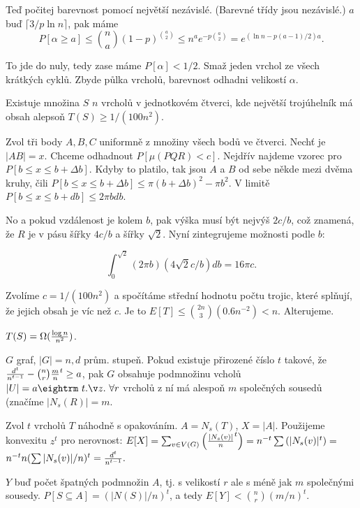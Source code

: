 Teď počitej barevnost pomocí největší nezávislé. (Barevné třídy jsou
nezávislé.) $a$ buď $\lceil 3/p \ln n \rceil$, pak máme
$$P[\alpha \ge a] \le {n \choose a} (1-p)^{{a \choose 2}} \le n^a e^{-p{a \choose 2}} =
e^{(\ln n -p(a-1)/2)a}.$$

To jde do nuly, tedy zase máme $P[\alpha] < 1/2$. Smaž jeden vrchol ze všech
krátkých cyklů.  Zbyde půlka vrcholů, barevnost odhadni velikostí $\alpha$.

\thm{} Existuje množina $S$ $n$ vrcholů v jednotkovém čtverci, kde
největší trojúhelník má obsah alepsoň $T(S) \ge 1/(100n^2)$.

\prf{} Zvol tři body $A,B,C$ uniformně z množiny všech bodů ve
čtverci. Nechť je $|AB| = x$. Chceme odhadnout $P[\mu(PQR) < c]$.
Nejdřív najdeme vzorec pro $P[b \le x \le b + \Delta b]$. Kdyby to
platilo, tak jsou $A$ a $B$ od sebe někde mezi dvěma kruhy, čili $P[b
\le x \le b + \Delta b] \le \pi(b+\Delta b)^2 - \pi b^2$. V limitě
$P[b \le x \le b + db] \le 2\pi b db$.

No a pokud vzdálenost je kolem $b$, pak výška musí být nejvýš $2c/b$,
což znamená, že $R$ je v pásu šířky $4c/b$ a šířky $\sqrt{2}$. Nyní
zintegrujeme možnosti podle $b$:

$$ \int_0^{\sqrt{2}}(2 \pi b)(4 \sqrt{2} c / b) db = 16 \pi c. $$ 

Zvolíme $c = 1/(100n^2)$ a spočítáme střední hodnotu počtu trojic,
které splňují, že jejich obsah je víc než $c$. Je to $E[T] \le {2n
\choose 3}(0.6n^{-2}) < n$. Alterujeme.

 $T(S) = \Omega({\log n \over n^2})$.
 

 $G$ graf, $|G| = n, d$ prům. stupeň. Pokud existuje
přirozené číslo $t$ takové, že ${d^t \over n^{t-1}} - {n \choose r} {m \over
n}^t \ge a$, pak $G$ obsahuje podmnožinu vcholů $|U|=a \st \forall r$ vrcholů z
ní má alespoň $m$ společných sousedů (značíme $|N_s(R)| = m$.

\prf{} Zvol $t$ vrcholů $T$ náhodně s opakováním. $A = N_s(T)$, $X = |A|$. Použijeme
konvexitu $z^t$ pro nerovnost:
$E[X] = \sum_{v \in V(G)} \left({ |N_s(v)| \over n}^t\right) = n^{-t} \sum \left(|N_s(v)|^t\right) =$ $n^{-t} n (\sum |N_s(v)|/n)^t
= {d^t \over n^{t-1}}.$

$Y$ buď počet špatných podmnožin $A$, tj. s velikostí $r$ ale s méně jak $m$ společnými
sousedy. $P[S \subseteq A] = (|N(S)|/n)^t$, a tedy $E[Y] < {n \choose r} \left(m/n\right)^t$.

